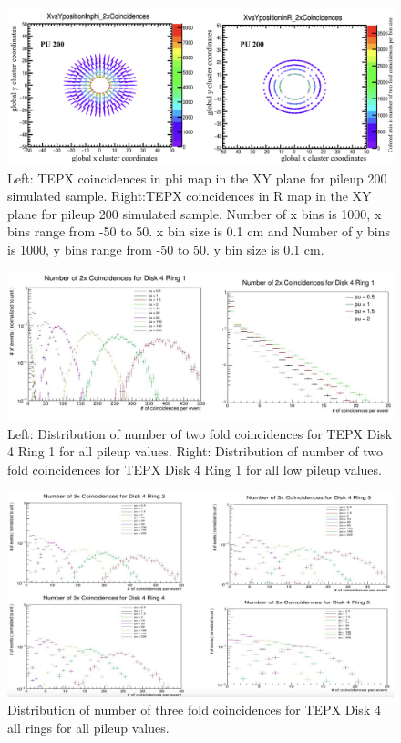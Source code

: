 \begin{figure}[H]
  \centering
  \includegraphics[width=1\columnwidth]{ashish_thesis/tepx_coincidences.png}
  \caption{Left: TEPX coincidences in phi map in the XY plane for pileup 200 simulated sample. Right:TEPX coincidences in R map in the XY plane for pileup 200 simulated sample. Number of x bins is 1000, x bins range from -50 to 50. x bin size is 0.1 cm and Number of y bins is 1000, y bins range from -50 to 50. y bin size is 0.1 cm.}
  \label{fig:tepx_coinc}
\end{figure}


\begin{figure}[H]
  \centering
  \includegraphics[width=1\columnwidth]{ashish_thesis/tepx_D4R1_coin_allpu.png}
  \caption{Left: Distribution of number of two fold coincidences for TEPX Disk 4 Ring 1 for all pileup values. Right: Distribution of number of two fold coincidences for TEPX Disk 4 Ring 1 for all low pileup values.}
  \label{fig:tepx_coin_allPU}
\end{figure}


\begin{figure}[H]
  \centering
  \includegraphics[width=1\columnwidth]{ashish_thesis/tepx_D4_3foldcoin_allpu.png}
  \caption{Distribution of number of three fold coincidences for TEPX Disk 4 all rings for all pileup values.}
  \label{fig:tepx_3foldcoin_allPU}
\end{figure}

